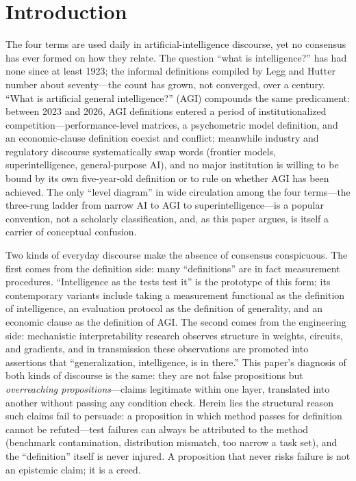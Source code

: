 \documentclass[10pt]{article}
\begin{document}
\section{Introduction}\label{sec:intro}

The four terms are used daily in artificial-intelligence discourse, yet no consensus has ever formed on how they relate. The question ``what is intelligence?'' has had none since at least 1923\cite{boring1923intelligence}; the informal definitions compiled by Legg and Hutter number about seventy\cite{legg2007definitions}---the count has grown, not converged, over a century. ``What is artificial general intelligence?'' (AGI) compounds the same predicament: between 2023 and 2026, AGI definitions entered a period of institutionalized competition---performance-level matrices\cite{morris2023levels}, a psychometric model definition\cite{hendrycks2025definition}, and an economic-clause definition\cite{openai2018charter} coexist and conflict; meanwhile industry and regulatory discourse systematically swap words (frontier models, superintelligence, general-purpose AI), and no major institution is willing to be bound by its own five-year-old definition or to rule on whether AGI has been achieved. The only ``level diagram'' in wide circulation among the four terms---the three-rung ladder from narrow AI to AGI to superintelligence---is a popular convention, not a scholarly classification, and, as this paper argues, is itself a carrier of conceptual confusion.

Two kinds of everyday discourse make the absence of consensus conspicuous. The first comes from the definition side: many ``definitions'' are in fact measurement procedures. ``Intelligence as the tests test it''\cite{boring1923intelligence} is the prototype of this form; its contemporary variants include taking a measurement functional as the definition of intelligence\cite{legg2007universal}, an evaluation protocol as the definition of generality\cite{morris2023levels,chollet2019measure}, and an economic clause as the definition of AGI\cite{openai2018charter}. The second comes from the engineering side: mechanistic interpretability research observes structure in weights, circuits, and gradients, and in transmission these observations are promoted into assertions that ``generalization, intelligence, is in there.'' This paper's diagnosis of both kinds of discourse is the same: they are not false propositions but \emph{overreaching propositions}---claims legitimate within one layer, translated into another without passing any condition check. Herein lies the structural reason such claims fail to persuade: a proposition in which method passes for definition cannot be refuted---test failures can always be attributed to the method (benchmark contamination, distribution mismatch, too narrow a task set), and the ``definition'' itself is never injured. A proposition that never risks failure is not an epistemic claim; it is a creed.
\end{document}
